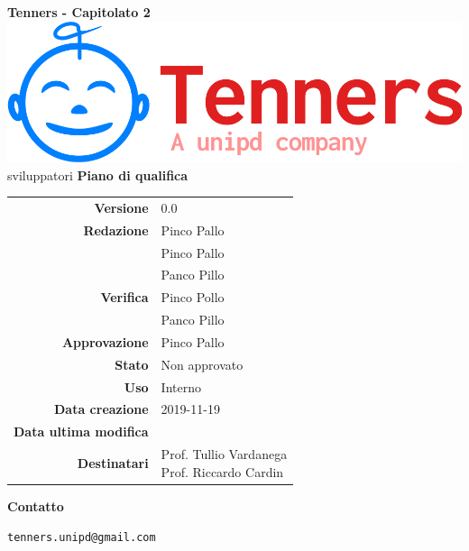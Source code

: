 \begin{titlepage}
	\begin{center}
		\large \textbf{Tenners - Capitolato 2}
		\vfill
		\includegraphics[scale = 0.3]{./res/img/logo.png}\\
sviluppatori		\vfill
		\Huge \textbf{Piano di qualifica}

        \vfill
        \large

        \begin{tabular}{r|l}
                        \textbf{Versione} & 0.0 \\
                        \textbf{Redazione} &
                        Pinco Pallo \\&
                        Pinco Pallo \\&
                        Panco Pillo \\
                        \textbf{Verifica} &
                        Pinco Pollo \\&
                        Panco Pillo \\
                        \textbf{Approvazione} & Pinco Pallo \\
                        \textbf{Stato} & Non approvato \\
                        \textbf{Uso} &  Interno\\
                        \textbf{Data creazione} &  2019-11-19\\
                        \textbf{Data ultima modifica} &  \\
                        \textbf{Destinatari} & \parbox[t]{5cm}{Prof. Tullio Vardanega\\Prof. Riccardo Cardin}
                \end{tabular}
                \vfill
                \normalsize
                \vfill
                \textbf{Contatto}

                \texttt{tenners.unipd@gmail.com}

	\end{center}
\end{titlepage}
